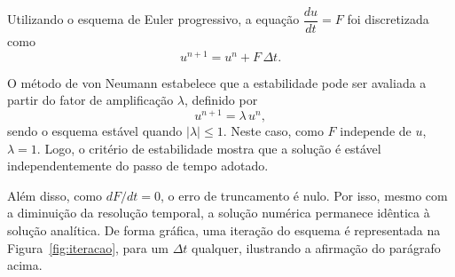\documentclass[11pt,a4paper]{article}
\begin{document}
Utilizando o esquema de Euler progressivo, a equação $\dfrac{du}{dt} = F$ foi discretizada como
\begin{equation}
  u^{n+1} = u^{n} + F\,\Delta t .
\end{equation}

O método de von Neumann estabelece que a estabilidade pode ser avaliada a partir do fator de amplificação $\lambda$, definido por
\begin{equation}
  u^{n+1} = \lambda\, u^{n} ,
\end{equation}
sendo o esquema estável quando $|\lambda| \le 1$. Neste caso, como $F$ independe de $u$, $\lambda = 1$. Logo, o critério de estabilidade mostra que a solução é estável independentemente do passo de tempo adotado.

Além disso, como $dF/dt = 0$, o erro de truncamento é nulo. Por isso, mesmo com a diminuição da resolução temporal, a solução numérica permanece idêntica à solução analítica. De forma gráfica, uma iteração do esquema é representada na Figura~\ref{fig:iteracao}, para um $\Delta t$ qualquer, ilustrando a afirmação do parágrafo acima.



\vspace{1.2em}
\noindent{}
\end{document}
